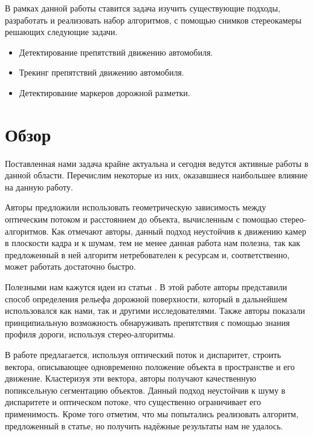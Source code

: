 \documentclass[aps,%
14pt,%
final,%
oneside,
onecolumn,%
musixtex, %
superscriptaddress,%
centertags]{extarticle} %
\begin{document}
В рамках данной работы ставится задача изучить существующие подходы, разработать и реализовать набор алгоритмов, с помощью снимков стереокамеры  решающих следующие задачи.
\begin{itemize}
    \item Детектирование препятствий движению автомобиля.
    \item Трекинг препятствий движению автомобиля.
    \item Детектирование маркеров дорожной разметки.
\end{itemize} 

\section{Обзор}










Поставленная нами задача крайне актуальна и сегодня ведутся активные работы в данной области. Перечислим некоторые из них, оказавшиеся наибольшее влияние на данную работу.

Авторы \cite{heinrich2002fast} предложили использовать геометрическую зависимость между оптическим потоком и расстоянием до объекта, вычисленным с помощью стерео-алгоритмов. Как отмечают авторы, данный подход неустойчив к движению камер в плоскости кадра и к шумам, тем не менее данная работа нам полезна, так как предложенный в ней алгоритм нетребователен к ресурсам и, соответственно, может работать достаточно быстро.

Полезными нам кажутся идеи из статьи \cite{labayrade2002real}. В этой работе авторы представили способ определения рельефа дорожной поверхности, который в дальнейшем использовался как нами, так и другими исследователями. Также авторы показали принципиальную возможность обнаруживать препятствия с помощью знания профиля дороги, используя стерео-алгоритмы.

В работе \cite{franke20056d} предлагается, используя оптический поток и диспаритет, строить вектора, описывающее одновременно положение объекта в пространстве и его движение. Кластеризуя эти вектора, авторы получают качественную попиксельную сегментацию объектов. Данный подход неустойчив к шуму в диспаритете и оптическом потоке, что существенно ограничивает его применимость. Кроме того отметим, что мы попытались реализовать алгоритм, предложенный в статье, но получить надёжные результаты нам не удалось.
\end{document}
